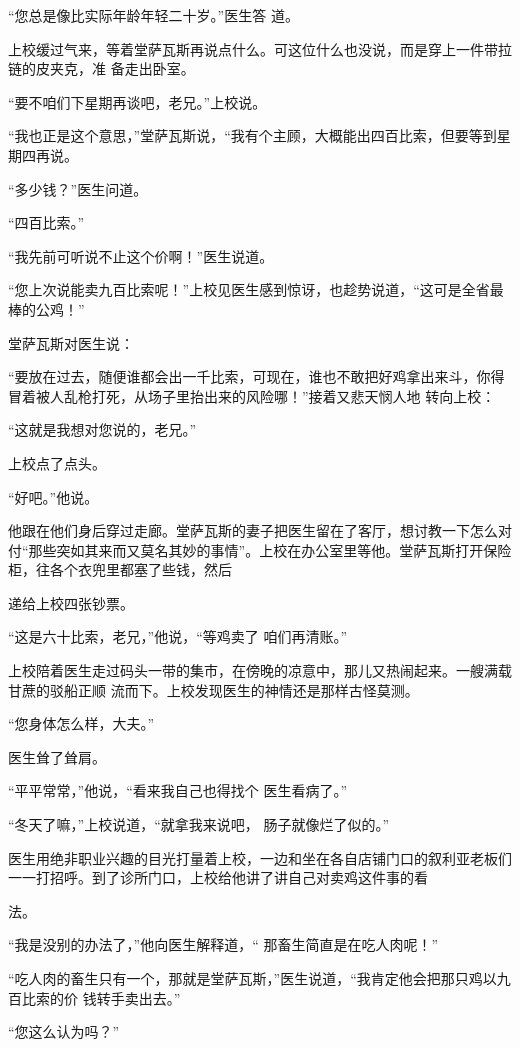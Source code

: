 \documentclass{article}
\begin{document}
“您总是像比实际年龄年轻二十岁。”医生答
道。 

上校缓过气来，等着堂萨瓦斯再说点什么。可这位什么也没说，而是穿上一件带拉链的皮夹克，准
备走出卧室。 

“要不咱们下星期再谈吧，老兄。”上校说。

“我也正是这个意思，”堂萨瓦斯说，“我有个主顾，大概能出四百比索，但要等到星期四再说。


“多少钱？”医生问道。 


“四百比索。” 

“我先前可听说不止这个价啊！”医生说道。

\newpage

“您上次说能卖九百比索呢！”上校见医生感到惊讶，也趁势说道，“这可是全省最棒的公鸡！”


堂萨瓦斯对医生说： 

“要放在过去，随便谁都会出一千比索，可现在，谁也不敢把好鸡拿出来斗，你得冒着被人乱枪打死，从场子里抬出来的风险哪！”接着又悲天悯人地
转向上校： 


“这就是我想对您说的，老兄。” 


上校点了点头。 


“好吧。”他说。 

他跟在他们身后穿过走廊。堂萨瓦斯的妻子把医生留在了客厅，想讨教一下怎么对付“那些突如其来而又莫名其妙的事情”。上校在办公室里等他。堂萨瓦斯打开保险柜，往各个衣兜里都塞了些钱，然后

\newpage
递给上校四张钞票。 

“这是六十比索，老兄，”他说，“等鸡卖了
咱们再清账。” 

上校陪着医生走过码头一带的集市，在傍晚的凉意中，那儿又热闹起来。一艘满载甘蔗的驳船正顺
流而下。上校发现医生的神情还是那样古怪莫测。 


“您身体怎么样，大夫。” 


医生耸了耸肩。 

“平平常常，”他说，“看来我自己也得找个
医生看病了。” 

“冬天了嘛，”上校说道，“就拿我来说吧，
肠子就像烂了似的。” 

医生用绝非职业兴趣的目光打量着上校，一边和坐在各自店铺门口的叙利亚老板们一一打招呼。到了诊所门口，上校给他讲了讲自己对卖鸡这件事的看
\newpage

法。 

“我是没别的办法了，”他向医生解释道，“
那畜生简直是在吃人肉呢！” 

“吃人肉的畜生只有一个，那就是堂萨瓦斯，”医生说道，“我肯定他会把那只鸡以九百比索的价
钱转手卖出去。” 


“您这么认为吗？” 
\end{document}
